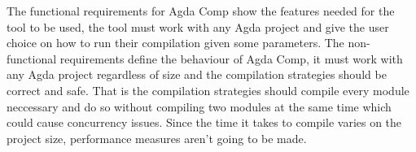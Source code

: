 The functional requirements for Agda Comp show the features needed for the tool
to be used, the tool must work with any Agda project and give the user choice
on how to run their compilation given some parameters. The non-functional
requirements define the behaviour of Agda Comp, it must work with any Agda
project regardless of size and the compilation strategies should be correct and
safe. That is the compilation strategies should compile every module neccessary
and do so without compiling two modules at the same time which could cause
concurrency issues. Since the time it takes to compile varies on the project
size, performance measures aren't going to be made.


%
